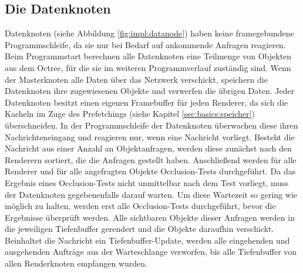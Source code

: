 \subsection{Die Datenknoten}
\label{sec:impl:daten}
Datenknoten (siehe Abbildung \ref{fig:impl:datanode}) haben keine framegebundene Programmschleife, da sie nur bei Bedarf auf ankommende Anfragen reagieren. Beim Programmstart berechnen alle Datenknoten eine Teilmenge von Objekten aus dem Octree, für die sie im weiteren Programmverlauf zuständig sind. Wenn der Masterknoten alle Daten über das Netzwerk verschickt, speichern die Datenknoten ihre zugewiesenen Objekte und verwerfen die übrigen Daten. Jeder Datenknoten besitzt einen eigenen Framebuffer für jeden Renderer, da sich die Kacheln im Zuge des Prefetchings (siehe Kapitel \ref{sec:basics:speicher}) überschneiden. In der Programmschleife der Datenknoten überwachen diese ihren Nachrichteneingang und reagieren nur, wenn eine Nachricht vorliegt. Besteht die Nachricht aus einer Anzahl an Objektanfragen, werden diese zunächst nach den Renderern sortiert, die die Anfragen gestellt haben. Anschließend werden für alle Renderer und für alle angefragten Objekte Occlusion-Tests durchgeführt. Da das Ergebnis eines Occlusion-Tests nicht unmittelbar nach dem Test vorliegt, muss der Datenknoten gegebenenfalls darauf warten. Um diese Wartezeit so gering wie möglich zu halten, werden erst alle Occlusion-Tests durchgeführt, bevor die Ergebnisse überprüft werden. Alle sichtbaren Objekte dieser Anfragen werden in die jeweiligen Tiefenbuffer gerendert und die Objekte daraufhin verschickt. Beinhaltet die Nachricht ein Tiefenbuffer-Update, werden alle eingehenden und ausgehenden Aufträge aus der Warteschlange verworfen, bis alle Tiefenbuffer von allen Renderknoten empfangen wurden.

